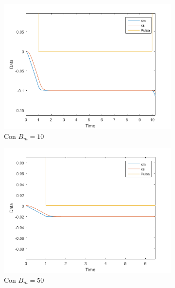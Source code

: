 \documentclass[a4paper, fontsize=11pt]{scrartcl} %
\numberwithin{equation}{section} %
\numberwithin{figure}{section} %
\numberwithin{table}{section} %
\begin{document}
	\begin{figure}[h!]
		\centering
		\begin{subfigure}[t]{.5\textwidth}
			\centering
			\includegraphics[width=1\linewidth]{images/Bm10-FP.PNG}
			\caption{Con $B_m = 10$}
			\label{Bm10-FP}
		\end{subfigure}%
		\begin{subfigure}[t]{.5\textwidth}
			\centering
			\includegraphics[width=1\linewidth]{images/Bm50-FP.PNG}
			\caption{Con $B_m = 50$}
			\label{Bm50-FP}
		\end{subfigure}
		\begin{subfigure}[t]{.5\textwidth}
			\centering

\end{subfigure}
\end{figure}
\end{document}
